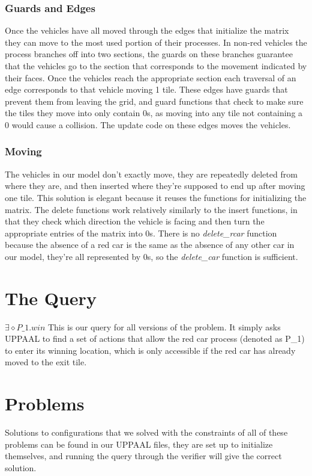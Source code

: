 \documentclass{article}
\begin{document}
\subsubsection{Guards and Edges}
Once the vehicles have all moved through the edges that initialize the matrix they can move to the most used portion of their processes. In non-red vehicles the process branches off into two sections, the guards on these branches guarantee that the vehicles go to the section that corresponds to the movement indicated by their faces. Once the vehicles reach the appropriate section each traversal of an edge corresponds to that vehicle moving 1 tile. These edges have guards that prevent them from leaving the grid, and guard functions that check to make sure the tiles they move into only contain 0s, as moving into any tile not containing a 0 would cause a collision. The update code on these edges moves the vehicles.

\subsubsection{Moving}
The vehicles in our model don't exactly move, they are repeatedly deleted from where they are, and then inserted where they're supposed to end up after moving one tile. This solution is elegant because it reuses the functions for initializing the matrix. The delete functions work relatively similarly to the insert functions, in that they check which direction the vehicle is facing and then turn the appropriate entries of the matrix into 0s. There is no \emph{delete\_rcar} function because the absence of a red car is the same as the absence of any other car in our model, they're all represented by 0s, so the \emph{delete\_car} function is sufficient.

\section{The Query}
$\exists \diamond P\_1.win$ This is our query for all versions of the problem. It simply asks UPPAAL to find a set of actions that allow the red car process (denoted as P\_1) to enter its winning location, which is only accessible if the red car has already moved to the exit tile.


\section{Problems}
Solutions to configurations that we solved with the constraints of all of these problems can be found in our UPPAAL files, they are set up to initialize themselves, and running the query through the verifier will give the correct solution.
\end{document}
